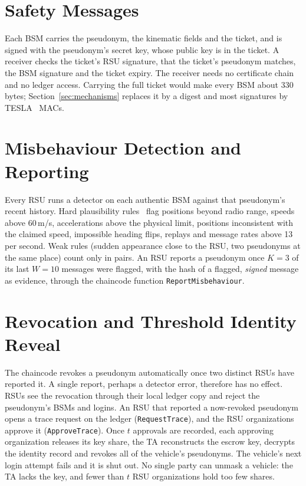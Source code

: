 \section{Safety Messages}

Each BSM carries the pseudonym, the kinematic fields and the ticket, and is signed with the
pseudonym's secret key, whose public key is in the ticket. A receiver checks the ticket's RSU
signature, that the ticket's pseudonym matches, the BSM signature and the ticket expiry. The receiver
needs no certificate chain and no ledger access. Carrying the full ticket would make every BSM
about 330 bytes; Section~\ref{sec:mechanisms} replaces it by a digest and most signatures by TESLA~\cite{perrig2000tesla} MACs.

\section{Misbehaviour Detection and Reporting}\label{sec:detect}

Every RSU runs a detector on each authentic BSM against that pseudonym's recent history. Hard
plausibility rules~\cite{heijden2018veremi} flag positions beyond radio range, speeds above 60\,m/s, accelerations above the
physical limit, positions inconsistent with the claimed speed, impossible heading flips, replays and
message rates above 13 per second. Weak rules (sudden appearance close to the RSU, two pseudonyms at
the same place) count only in pairs. An RSU reports a pseudonym once $K = 3$ of its last $W = 10$
messages were flagged, with the hash of a flagged, \emph{signed} message as evidence, through the
chaincode function \texttt{ReportMisbehaviour}.

\section{Revocation and Threshold Identity Reveal}

The chaincode revokes a pseudonym automatically once two distinct RSUs have reported it. A single
report, perhaps a detector error, therefore has no effect. RSUs see the revocation through their
local ledger copy and reject the pseudonym's BSMs and logins. An RSU that reported a now-revoked
pseudonym opens a trace request on the ledger (\texttt{RequestTrace}), and the RSU organizations
approve it (\texttt{ApproveTrace}). Once $t$ approvals are recorded, each approving organization
releases its key share, the TA reconstructs the escrow key, decrypts the identity record and revokes
all of the vehicle's pseudonyms. The vehicle's next login attempt fails and it is shut out. No single
party can unmask a vehicle: the TA lacks the key, and fewer than $t$ RSU organizations hold too few
shares.


